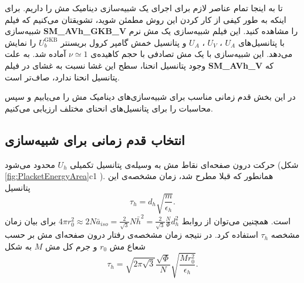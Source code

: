 تا به اینجا تمام عناصر لازم برای اجرای یک شبیه‌سازی دینامیک مش را داریم. برای اینکه به طور کیفی از کار کردن این روش مطمئن شوید، تشویقتان می‌کنیم که فیلم‌ شبیه‌سازی
\textbf{SM\_AVh\_GKB\_V} 
را مشاهده کنید. این فیلم شبیه‌سازی یک مش نرم با پتانسیل‌های 
$U_A$
،
$U_V$
،
$U_A$
و پتانسیل خمش گامپر کرول بریسنتر 
$U_b^\text{GKB}$
را نمایش می‌دهد. این شبیه‌سازی با یک مش تصادفی با حجم کاهیده‌ی 
 $\nu\simeq1$
آماده شد. به علت وجود پتانسیل انحنا، سطح این غشا نسبت به غشای در فیلم
\textbf{SM\_AVh\_V}
که پتانسیل انحنا ندارد، صاف‌تر است.

در این بخش قدم زمانی مناسب برای شبیه‌سازی‌های دینامیک مش را می‌یابیم و سپس محاسبات را برای پتانسیل‌های انحنای مختلف ارزیابی می‌کنیم.






\subsection{\label{sec:ResultsTimeStep}
انتخاب قدم زمانی برای شبیه‌سازی
}

حرکت درون صفحه‌ای نقاط مش به وسیله‌ی پتانسیل تکمیلی
$U_h$
محدود می‌شود (شکل 
\ref{fig:PlacketEnergyArea}c1
). همانطور که قبلا مطرح شد، زمان مشخصه‌ی این پتانسیل
\begin{equation}
\tau_{h}= d_h\sqrt{\frac{m}{\epsilon_h}}.
\label{eq:tauWCAh}
\end{equation}
است. همچنین می‌توان از روابط
 $4\pi r_0^2\approx2N\bar a_{iso}=\frac{2}{\sqrt{3}} N {\bar h}^2 = \frac{2}{\sqrt{3}} \frac{N}{\Phi} d_h^2$
برای بیان زمان مشخصه‌
$\tau_h$
استفاده کرد. در نتیجه زمان مشخصه‌ی رفتار درون صفحه‌ای مش بر حسب شعاع مش 
 $r_0$
و جرم کل مش
 $M$
به شکل
\begin{equation}
\tau_{h}
=  \sqrt{2\pi\sqrt{3} }  \frac{\sqrt{\Phi}}{N}\sqrt{\frac{M r_0^2}{\epsilon_h}}.
\label{eq:tauWCAh M r0}
\end{equation}

